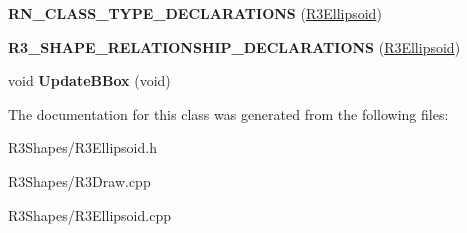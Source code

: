 \begin{DoxyCompactItemize}
\item 
{\bfseries R\+N\+\_\+\+C\+L\+A\+S\+S\+\_\+\+T\+Y\+P\+E\+\_\+\+D\+E\+C\+L\+A\+R\+A\+T\+I\+O\+NS} (\hyperlink{class_r3_ellipsoid}{R3\+Ellipsoid})\hypertarget{class_r3_ellipsoid_ac1b6ac4e5624791735c4519c865eaf48}{}\label{class_r3_ellipsoid_ac1b6ac4e5624791735c4519c865eaf48}

\item 
{\bfseries R3\+\_\+\+S\+H\+A\+P\+E\+\_\+\+R\+E\+L\+A\+T\+I\+O\+N\+S\+H\+I\+P\+\_\+\+D\+E\+C\+L\+A\+R\+A\+T\+I\+O\+NS} (\hyperlink{class_r3_ellipsoid}{R3\+Ellipsoid})\hypertarget{class_r3_ellipsoid_a0998386a1093e03bd9826a0eee8d6f6d}{}\label{class_r3_ellipsoid_a0998386a1093e03bd9826a0eee8d6f6d}

\item 
void {\bfseries Update\+B\+Box} (void)\hypertarget{class_r3_ellipsoid_abd9dffc092074e55c3d2d0d8620cc381}{}\label{class_r3_ellipsoid_abd9dffc092074e55c3d2d0d8620cc381}

\end{DoxyCompactItemize}


The documentation for this class was generated from the following files\+:\begin{DoxyCompactItemize}
\item 
R3\+Shapes/R3\+Ellipsoid.\+h\item 
R3\+Shapes/R3\+Draw.\+cpp\item 
R3\+Shapes/R3\+Ellipsoid.\+cpp\end{DoxyCompactItemize}
